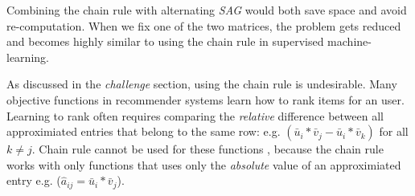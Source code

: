 Combining the chain rule with alternating \emph{SAG} would both save space and avoid re-computation.
When we fix one of the two matrices, the problem gets reduced and becomes highly similar to using the chain rule in supervised machine-learning.  

As discussed in the \emph{challenge} section, using the chain rule is undesirable.
Many objective functions in recommender systems learn how to rank items for an user.
Learning to rank often requires comparing the \emph{relative} difference between all approximiated entries that belong to the same row:
e.g. $\left(\bar{u}_{i}*\bar{v}_{j} - \bar{u}_{i}*\bar{v}_{k}\right)$ for all $k \neq j$.
Chain rule cannot be used for these functions \cite{gapfm, climf, bpr, mnar, mmmf}, because 
the chain rule works with only functions that uses only the \emph{absolute} value of an approximiated entry e.g. ($\hat{a}_{ij} = \bar{u}_{i}*\bar{v}_{j}$).
